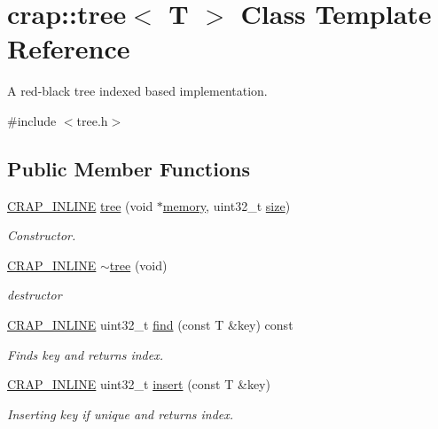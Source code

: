 \hypertarget{classcrap_1_1tree}{\section{crap\+:\+:tree$<$ T $>$ Class Template Reference}
\label{classcrap_1_1tree}
}


A red-\/black tree indexed based implementation.  




{\ttfamily \#include $<$tree.\+h$>$}

\subsection*{Public Member Functions}
\begin{DoxyCompactItemize}
\item 
\hyperlink{config__x86_8h_a5a40526b8d842e7ff731509998bb0f1c}{C\+R\+A\+P\+\_\+\+I\+N\+L\+I\+N\+E} \hyperlink{classcrap_1_1tree_abc5b5f148562a70cdc7701e756357943}{tree} (void $\ast$\hyperlink{classcrap_1_1tree_a64f079b15a1560ee59595e23a550d1d3}{memory}, uint32\+\_\+t \hyperlink{classcrap_1_1tree_aeb959132fdf029c341d17b4caf21ba43}{size})
\begin{DoxyCompactList}\small\item\em Constructor. \end{DoxyCompactList}\item 
\hyperlink{config__x86_8h_a5a40526b8d842e7ff731509998bb0f1c}{C\+R\+A\+P\+\_\+\+I\+N\+L\+I\+N\+E} \hyperlink{classcrap_1_1tree_a1982fa6e379d412f25df826017838b7a}{$\sim$tree} (void)
\begin{DoxyCompactList}\small\item\em destructor \end{DoxyCompactList}\item 
\hyperlink{config__x86_8h_a5a40526b8d842e7ff731509998bb0f1c}{C\+R\+A\+P\+\_\+\+I\+N\+L\+I\+N\+E} uint32\+\_\+t \hyperlink{classcrap_1_1tree_acc6aa000cc88ac9ecdf88ea3a815520e}{find} (const T \&key) const 
\begin{DoxyCompactList}\small\item\em Finds key and returns index. \end{DoxyCompactList}\item 
\hyperlink{config__x86_8h_a5a40526b8d842e7ff731509998bb0f1c}{C\+R\+A\+P\+\_\+\+I\+N\+L\+I\+N\+E} uint32\+\_\+t \hyperlink{classcrap_1_1tree_a77e77b440e851db51154b6226f4a5f6a}{insert} (const T \&key)
\begin{DoxyCompactList}\small\item\em Inserting key if unique and returns index. \end{DoxyCompactList}\item 

\end{DoxyCompactItemize}

